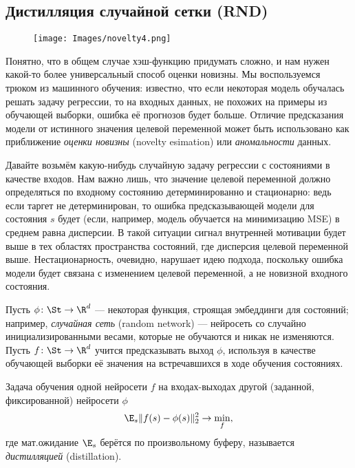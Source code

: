 \subsection{Дистилляция случайной сетки (RND)}

\begin{wrapfigure}{r}{0.55\textwidth}
\vspace{-0.4cm}
\centering
\texttt{[image: Images/novelty4.png]}
\vspace{-0.5cm}
\end{wrapfigure}

Понятно, что в общем случае хэш-функцию придумать сложно, и нам нужен какой-то более универсальный способ оценки новизны. Мы воспользуемся трюком из машинного обучения: известно, что если некоторая модель обучалась решать задачу регрессии, то на входных данных, не похожих на примеры из обучающей выборки, ошибка её прогнозов будет больше. Отличие предсказания модели от истинного значения целевой переменной может быть использовано как приближение \emph{оценки новизны} (novelty esimation) или \emph{аномальности} данных.

Давайте возьмём какую-нибудь случайную задачу регрессии с состояниями в качестве входов. Нам важно лишь, что значение целевой переменной должно определяться по входному состоянию детерминированно и стационарно: ведь если таргет не детерминирован, то ошибка предсказывающей модели для состояния $s$ будет (если, например, модель обучается на минимизацию MSE) в среднем равна дисперсии. В такой ситуации сигнал внутренней мотивации будет выше в тех областях пространства состояний, где дисперсия целевой переменной выше. Нестационарность, очевидно, нарушает идею подхода, поскольку ошибка модели будет связана с изменением целевой переменной, а не новизной входного состояния. 

Пусть $\phi \colon \St \to \R^d$ --- некоторая функция, строящая эмбеддинги для состояний; например, \emph{случайная сеть} (random network) --- нейросеть со случайно инициализированными весами, которые не обучаются и никак не изменяются. Пусть $f \colon \St \to \R^d$ учится предсказывать выход $\phi$, используя в качестве обучающей выборки её значения на встречавшихся в ходе обучения состояниях.

\begin{definition}
Задача обучения одной нейросети $f$ на входах-выходах другой (заданной, фиксированной) нейросети $\phi$
$$\E_s \|f(s) - \phi(s)\|_2^2 \to \min_{f},$$
где мат.ожидание $\E_s$ берётся по произвольному буферу, называется \emph{дистилляцией} (distillation).
\end{definition}

